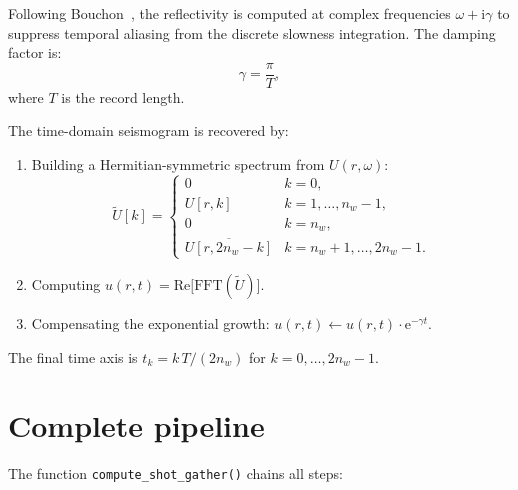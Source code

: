 \documentclass[11pt,a4paper]{article}
\newcommand{\ee}{\mathrm{e}}
\newcommand{\ii}{\mathrm{i}}
\begin{document}
Following Bouchon~\cite{bouchon1981}, the reflectivity is computed at
complex frequencies $\omega + \ii\gamma$ to suppress temporal aliasing
from the discrete slowness integration.  The damping factor is:
\begin{equation}
  \gamma = \frac{\pi}{T},
\end{equation}
where $T$ is the record length.

The time-domain seismogram is recovered by:
\begin{enumerate}[nosep]
  \item Building a Hermitian-symmetric spectrum from $U(r, \omega)$:
    \begin{equation}
      \tilde{U}[k] = \begin{cases}
        0 & k = 0, \\
        U[r, k] & k = 1, \ldots, n_w{-}1, \\
        0 & k = n_w, \\
        \overline{U[r, 2n_w{-}k]} & k = n_w{+}1, \ldots, 2n_w{-}1.
      \end{cases}
    \end{equation}
  \item Computing $u(r, t) = \text{Re}\bigl[\text{FFT}(\tilde{U})\bigr]$.
  \item Compensating the exponential growth:
    $u(r, t) \leftarrow u(r, t) \cdot \ee^{-\gamma t}$.
\end{enumerate}

The final time axis is $t_k = k\,T / (2 n_w)$ for
$k = 0, \ldots, 2n_w - 1$.

\section{Complete pipeline}
\label{sec:pipeline}

The function \texttt{compute\_shot\_gather()} chains all steps:
\end{document}
